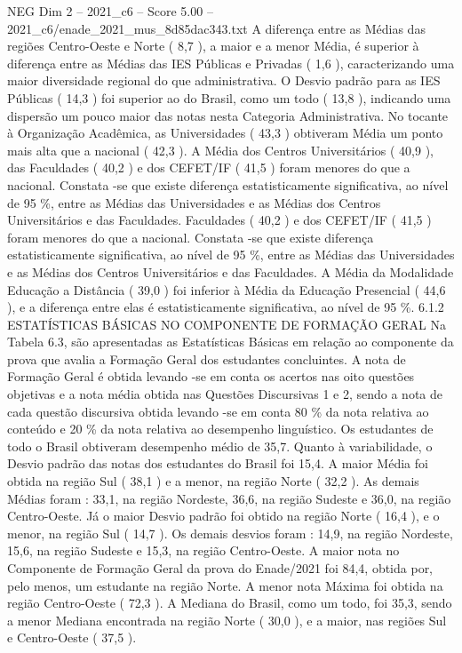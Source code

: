 \begin{textsample}{NEG Dim 2 – 2021\_c6 – Score 5.00 – 2021\_c6/enade\_2021\_mus\_8d85dac343.txt}
A diferença entre as Médias das regiões Centro-Oeste e Norte ( 8,7 ), a maior e a menor Média, é superior à diferença entre as Médias das IES Públicas e Privadas ( 1,6 ), caracterizando uma maior diversidade regional do que administrativa.
O Desvio padrão para as IES Públicas ( 14,3 ) foi superior ao do Brasil, como um todo ( 13,8 ), indicando uma dispersão um pouco maior das notas nesta Categoria Administrativa.
No tocante à Organização Acadêmica, as Universidades ( 43,3 ) obtiveram Média um ponto mais alta que a nacional ( 42,3 ).
A Média dos Centros Universitários ( 40,9 ), das Faculdades ( 40,2 ) e dos CEFET/IF ( 41,5 ) foram menores do que a nacional.
Constata -se que existe diferença estatisticamente significativa, ao nível de 95 \%, entre as Médias das Universidades e as Médias dos Centros Universitários e das Faculdades.
Faculdades ( 40,2 ) e dos CEFET/IF ( 41,5 ) foram menores do que a nacional.
Constata -se que existe diferença estatisticamente significativa, ao nível de 95 \%, entre as Médias das Universidades e as Médias dos Centros Universitários e das Faculdades.
A Média da Modalidade Educação a Distância ( 39,0 ) foi inferior à Média da Educação Presencial ( 44,6 ), e a diferença entre elas é estatisticamente significativa, ao nível de 95 \%. 6.1.2 ESTATÍSTICAS BÁSICAS NO COMPONENTE DE FORMAÇÃO GERAL Na Tabela 6.3, são apresentadas as Estatísticas Básicas em relação ao componente da prova que avalia a Formação Geral dos estudantes concluintes.
A nota de Formação Geral é obtida levando -se em conta os acertos nas oito questões objetivas e a nota média obtida nas Questões Discursivas 1 e 2, sendo a nota de cada questão discursiva obtida levando -se em conta 80 \% da nota relativa ao conteúdo e 20 \% da nota relativa ao desempenho linguístico.
Os estudantes de todo o Brasil obtiveram desempenho médio de 35,7.
Quanto à variabilidade, o Desvio padrão das notas dos estudantes do Brasil foi 15,4.
A maior Média foi obtida na região Sul ( 38,1 ) e a menor, na região Norte ( 32,2 ).
As demais Médias foram : 33,1, na região Nordeste, 36,6, na região Sudeste e 36,0, na região Centro-Oeste.
Já o maior Desvio padrão foi obtido na região Norte ( 16,4 ), e o menor, na região Sul ( 14,7 ).
Os demais desvios foram : 14,9, na região Nordeste, 15,6, na região Sudeste e 15,3, na região Centro-Oeste.
A maior nota no Componente de Formação Geral da prova do Enade/2021 foi 84,4, obtida por, pelo menos, um estudante na região Norte.
A menor nota Máxima foi obtida na região Centro-Oeste ( 72,3 ).
A Mediana do Brasil, como um todo, foi 35,3, sendo a menor Mediana encontrada na região Norte ( 30,0 ), e a maior, nas regiões Sul e Centro-Oeste ( 37,5 ).

\end{textsample}
